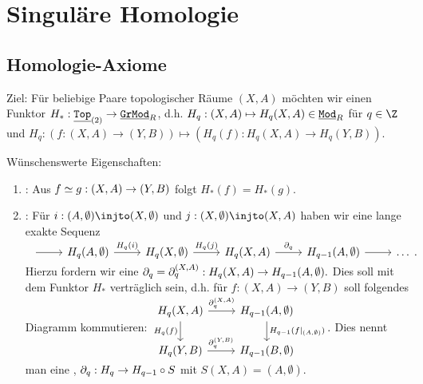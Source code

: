 \chapter{Singuläre Homologie}

\section{Homologie-Axiome}


Ziel: Für beliebige Paare topologischer Räume $(X, A)$ möchten wir einen Funktor $H_*: \underline{\mathtt{Top}}_{(2)} \to \underline{\mathtt{GrMod}}_R$, d.h. $H_q: (X, A) \mapsto H_q(X,A) \in \underline{\mathtt{Mod}}_R$ für $q \in \Z$ und $H_q: (f:(X, A) \to (Y, B)) \mapsto (H_q(f): H_q(X,A) \to H_q(Y,B))$.

Wünschenswerte Eigenschaften:
\begin{enumerate}[(1)]
    \item
        : Aus $f \simeq g: (X, A) \to (Y, B)$ folgt $H_*(f) = H_*(g)$.
    \item
        : Für $i: (A, \emptyset) \injto (X, \emptyset)$ und $j: (X, \emptyset) \injto (X, A)$ haben wir eine lange exakte Sequenz
        \begin{math}
            \begin{tikzcd}
                {} \ar[r] & H_q(A,\emptyset) \ar[r,"H_q(i)"] & H_q(X,\emptyset) \ar[r,"H_q(j)"] & H_q(X,A) \ar[r,"\del_q"] & H_{q-1}(A,\emptyset) \ar[r] & \dotsc
            \end{tikzcd}.
        \end{math}
        Hierzu fordern wir eine 
        \begin{math}
            \mathord{\partial}_q = \mathord{\partial}_q^{(X,A)}: H_q(X, A) \to H_{q-1}(A, \emptyset).
        \end{math}
        Dies soll mit dem Funktor $H_*$ verträglich sein, d.h. für $f: (X, A) \to (Y, B)$ soll folgendes Diagramm kommutieren:
        \begin{math}
            \begin{tikzcd}
                H_q(X, A) \ar[r,"\del_q^{(X,A)}"] \ar[d,"H_q(f)"'] & H_{q-1}(A, \emptyset) \ar[d,"H_{q-1}(f|_{(A, \emptyset)})"] \\
                H_q(Y, B) \ar[r,"\del_q^{(Y,B)}"] & H_{q-1}(B, \emptyset)
            \end{tikzcd}.
        \end{math}
        Dies nennt man eine , $\mathord{\partial}_q: H_q \to H_{q-1} \circ S$ mit $S(X, A) = (A, \emptyset)$.

\end{enumerate}
